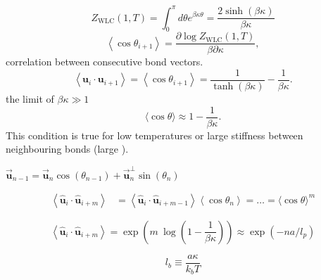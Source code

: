 \begin{equation}
    Z_{\mathrm{WLC}}(1, T)=\int_{0}^{\pi} d \theta e^{\beta \kappa \theta}=\frac{2 \sinh(\beta
    \kappa)}{\beta \kappa}
\end{equation}
\begin{equation}
    \left\langle\cos \theta_{i+1}\right\rangle
    =\frac{\partial \log Z_{\mathrm{WLC}}(1, T)}{\beta \partial \kappa},
\end{equation}
correlation between consecutive bond vectors.
\begin{equation}
    \left\langle\boldsymbol{u}_{i} \cdot \boldsymbol{u}_{i+1}\right\rangle
    = \left\langle\cos \theta_{i+1}\right\rangle
    = \frac{1}{\tanh(\beta \kappa)} - \frac{1}{\beta \kappa}.
\end{equation}
the limit of $\beta \kappa \gg 1$
\begin{equation}
    \langle\cos \theta\rangle \approx 1-\frac{1}{\beta \kappa}.
\end{equation}
This condition is true for low temperatures or large stiffness between neighbouring bonds
(large \kappa).

$\boldsymbol{\vec{u}}_{n-1} = \boldsymbol{\vec{u}}_{n} \cos(\theta_{n-1}) +
\boldsymbol{\vec{u}}_{n}^{\perp} \sin(\theta_{n})$


\begin{equation}
\begin{aligned}
    \left\langle\boldsymbol{\hat{u}}_{i} \cdot \boldsymbol{\hat{u}}_{i+m}\right\rangle
    &=\left\langle\boldsymbol{\hat{u}}_{i} \cdot
        \boldsymbol{\hat{u}}_{i+m-1}\right\rangle\left\langle\cos
    \theta_{n}\right\rangle = \dots =\langle\cos \theta\rangle^{m}
\end{aligned}
\end{equation}

\begin{equation}
    \left\langle\boldsymbol{\hat{u}}_{i} \cdot \boldsymbol{\hat{u}}_{i+m}\right\rangle =
    \exp(m\ \log(1 - \frac{1}{\beta \kappa})) \approx \exp(-na/l_p)
\end{equation}

\begin{equation}
l_b \equiv \frac{a \kappa}{k_{b} T}
\end{equation}

